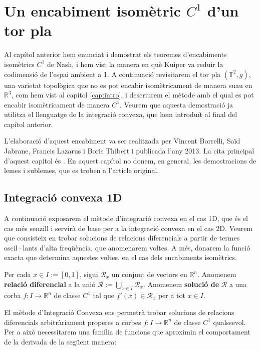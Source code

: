 \chapter{Un encabiment isomètric $C^1$ d'un tor pla}

Al capítol anterior hem enunciat i demostrat els teoremes d'encabiments isomètrics $C^1$ de Nash, i hem vist la manera en què Kuiper va reduir la codimensió de l'espai ambient a 1. A continuació revisitarem el tor pla $(\mathbb T^2, g)$, una varietat topològica que no es pot encabir isomètricament de manera suau en $\mathbb R^3$, com hem vist al capítol \ref{cap:intro}, i descriurem el mètode amb el qual es pot encabir isomètricament de manera $C^1$. 
Veurem que aquesta demostració ja utilitza el llenguatge de la integració convexa, que hem introduït al final del capítol anterior.

L'elaboració d'aquest encabiment va ser realitzada per Vincent Borrelli, Saïd Jabrane, Francis Lazarus i Boris Thibert i publicada l'any 2013. La cita principal d'aquest capítol és \cite{borrelli2013}. En aquest capítol no donem, en general, les demostracions de lemes i sublemes, que es troben a l'article original.

\section{Integració convexa 1D}
A continuació exposarem el mètode d'integració convexa en el cas 1D, que és el cas més senzill i servirà de base per a la integració convexa en el cas 2D. Veurem que consisteix en trobar solucions de relacions diferencials a partir de termes oscil·lants d'alta freqüència, que anomenarem voltes. A més, donarem la funció exacta que determina aquestes voltes, en el cas dels encabiments isomètrics.

\begin{defi}
    Per cada $x\in I := [0,1]$, sigui $\mathcal R_x$ un conjunt de vectors en $\mathbb R^n$. Anomenem \textbf{relació diferencial} a la unió $\mathcal R := \bigcup_{x\in I} \mathcal R_x$. Anomenem \textbf{solució de} $\mathcal R$ a una corba $f:I\to\mathbb R^n$ de classe $C^1$ tal que $f'(x)\in\mathcal R_x$ per a tot $x\in I$.
\end{defi}

El mètode d'Integració Convexa ens permetrà trobar solucions de relacions diferencials arbitràriament properes a corbes $f:I\to\mathbb R^n$ de classe $C^1$ qualssevol. Per a això necessitarem una família de funcions que aproximin el comportament de la derivada de la següent manera:

